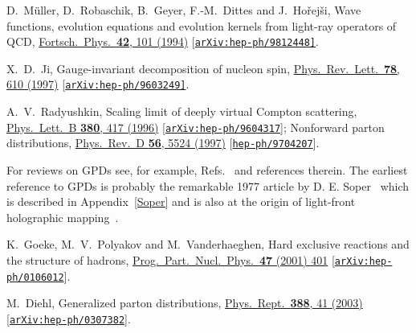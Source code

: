 \documentclass[aps,prd,preprint,groupedaddress]{revtex4-1}
\begin{document}
\begin{thebibliography}{99}


  D.~M\"uller, D.~Robaschik, B.~Geyer, F.-M.~Dittes and J.~Ho\v{r}ej\v{s}i,
  Wave functions, evolution equations and evolution kernels from light-ray operators of QCD,
  \href{http://onlinelibrary.wiley.com/doi/10.1002/prop.2190420202/abstract;jsessionid=D3A83A89DC0A2F6868418EF29E9C8AB4.f04t01}{Fortsch.\ Phys.\  {\bf 42}, 101 (1994)}
  [\href{https://arxiv.org/abs/hep-ph/9812448}{\tt arXiv:hep-ph/9812448]}.


  X.~D.~Ji,
  Gauge-invariant decomposition of nucleon spin,
  \href{https://journals.aps.org/prl/abstract/10.1103/PhysRevLett.78.610}{Phys.\ Rev.\ Lett.\  {\bf 78}, 610 (1997)}
  [\href{https://arxiv.org/abs/hep-ph/9603249}{\tt arXiv:hep-ph/9603249]}.
  
  
  A.~V.~Radyushkin,
  Scaling limit of deeply virtual Compton scattering,
  \href{http://www.sciencedirect.com/science/article/pii/037026939600528X?via%3Dihub}{Phys.\ Lett.\ B {\bf 380}, 417 (1996)}
  [\href{https://arxiv.org/abs/hep-ph/9604317}{\tt arXiv:hep-ph/9604317}];
  Nonforward parton distributions,
  \href{https://journals.aps.org/prd/abstract/10.1103/PhysRevD.56.5524}{Phys.\ Rev.\ D {\bf 56}, 5524 (1997)}
  [\href{https://arxiv.org/abs/hep-ph/9704207}{\tt hep-ph/9704207}].


 For reviews on GPDs see, for example, Refs.~\cite{Goeke:2001tz, Diehl:2003ny, Belitsky:2005qn, Boffi:2007yc, Guidal:2013rya} and references therein. The earliest reference to GPDs is probably the remarkable 1977 article by D. E. Soper~\cite{Soper:1976jc} which is described in Appendix~\ref{Soper} and is also at the origin of light-front holographic mapping~\cite{Brodsky:2006uqa, Brodsky:2014yha}.

  
  K.~Goeke, M.~V.~Polyakov and M.~Vanderhaeghen,
  Hard exclusive reactions and the structure of hadrons,
  \href{http://www.sciencedirect.com/science/article/pii/S0146641001001582?via%3Dihub}{Prog.\ Part.\ Nucl.\ Phys.\  {\bf 47} (2001) 401}
  [\href{https://arxiv.org/abs/hep-ph/0106012}{\tt arXiv:hep-ph/0106012}].


  M.~Diehl,
  Generalized parton distributions,
  \href{http://www.sciencedirect.com/science/article/pii/S0370157303003338?via%3Dihub}{Phys.\ Rept.\  {\bf 388}, 41 (2003)}
  [\href{https://arxiv.org/abs/hep-ph/0307382}{\tt arXiv:hep-ph/0307382}].



\end{thebibliography}
\end{document}
